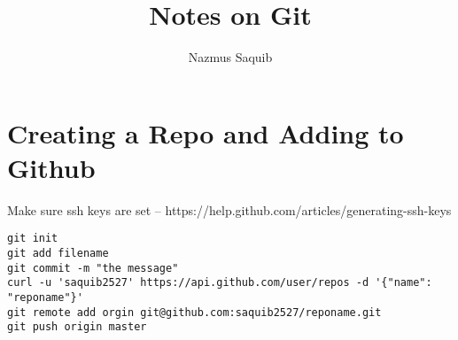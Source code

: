 \documentclass[a4paper, 12pt]{article}
\begin{document}
\title{Notes on Git}
\author{Nazmus Saquib}

\maketitle

\section{Creating a Repo and Adding to Github}
Make sure ssh keys are set -- https://help.github.com/articles/generating-ssh-keys
\begin{verbatim}
git init
git add filename
git commit -m "the message"
curl -u 'saquib2527' https://api.github.com/user/repos -d '{"name": "reponame"}'
git remote add orgin git@github.com:saquib2527/reponame.git
git push origin master
\end{verbatim}
\end{document}
